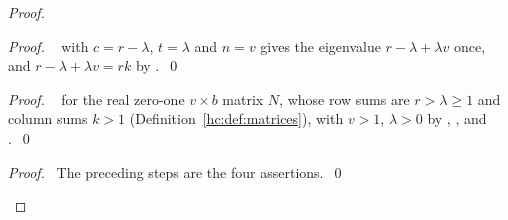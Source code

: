 \begin{proof}
 \begin{proof}\pf\  with $c=r-\lambda$, $t=\lambda$ and $n=v$ gives the
  eigenvalue $r-\lambda+\lambda v$ once, and $r-\lambda+\lambda v=rk$ by
  .~\qed\end{proof}
 \begin{proof}\pf\  for the real zero-one $v\times b$ matrix $N$, whose row
  sums are $r>\lambda\ge1$ and column sums $k>1$ (Definition~\ref{hc:def:matrices}), with $v>1$,
  $\lambda>0$ by , ,  and .~\qed\end{proof}
 \qedstep
 \begin{proof}\pf\ The preceding steps are the four assertions.~\qed\end{proof}
\end{proof}

